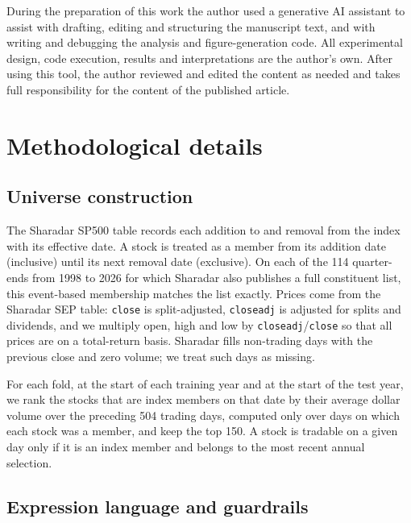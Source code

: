 \documentclass[preprint,12pt,authoryear]{elsarticle}
\begin{document}
During the preparation of this work the author used a generative AI assistant to assist with drafting, editing and structuring the manuscript text, and with writing and debugging the analysis and figure-generation code. All experimental design, code execution, results and interpretations are the author's own. After using this tool, the author reviewed and edited the content as needed and takes full responsibility for the content of the published article.




\appendix

\section{Methodological details}\label{app:methods}

\subsection{Universe construction}\label{app:universe}

The Sharadar SP500 table records each addition to and removal from the index with its effective date. A stock is treated as a member from its addition date (inclusive) until its next removal date (exclusive). On each of the 114 quarter-ends from 1998 to 2026 for which Sharadar also publishes a full constituent list, this event-based membership matches the list exactly. Prices come from the Sharadar SEP table: \texttt{close} is split-adjusted, \texttt{closeadj} is adjusted for splits and dividends, and we multiply open, high and low by \texttt{closeadj}/\texttt{close} so that all prices are on a total-return basis. Sharadar fills non-trading days with the previous close and zero volume; we treat such days as missing.

For each fold, at the start of each training year and at the start of the test year, we rank the stocks that are index members on that date by their average dollar volume over the preceding 504 trading days, computed only over days on which each stock was a member, and keep the top 150. A stock is tradable on a given day only if it is an index member and belongs to the most recent annual selection.

\subsection{Expression language and guardrails}\label{app:guardrails}
\end{document}
